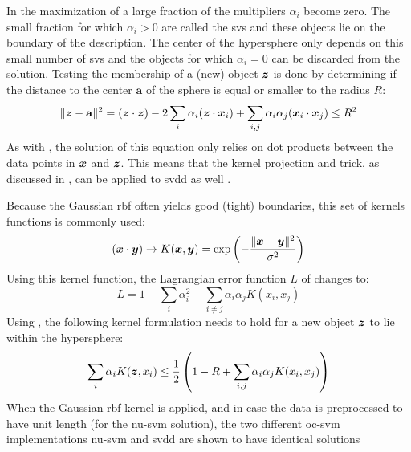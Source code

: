In the maximization of  a large fraction of the multipliers $\alpha_i$ become zero.
The small fraction for which $\alpha_i > 0$ are called the \glspl{sv} and these objects lie on the boundary of the description.
The center of the hypersphere only depends on this small number of \glspl{sv} and the objects for which $\alpha_i = 0$ can be discarded from the solution.
Testing the membership of a (new) object $\vectorsym{z}$ is done by determining if the distance to the center $\mathbf{a}$ of the sphere is equal or smaller to the radius $R$:
\begin{equation}\label{eq:svdd_test_object}
  \lVert \vectorsym{z} - \mathbf{a} \rVert ^2 = (\vectorsym{z} \cdot \vectorsym{z}) - 2 \sum_{i} \alpha_i(\vectorsym{z} \cdot \vectorsym{x}_i) + \sum_{i,j} \alpha_i \alpha_j (\vectorsym{x}_i \cdot \vectorsym{x}_j) \le R^2
\end{equation}
As with , the solution of this equation only relies on dot products between the data points in $\vectorsym{x}$ and $\vectorsym{z}$.
This means that the kernel projection and trick, as discussed in , can be applied to \gls{svdd} as well \cite{tax1999support,tax2002uniform}.

Because the Gaussian \gls{rbf} often yields good (\ie tight) boundaries, this set of kernels functions is commonly used:
\begin{equation}
  (\vectorsym{x} \cdot \vectorsym{y}) \rightarrow K(\vectorsym{x},\vectorsym{y}) = \operatorname{exp}\left(- \frac{\lVert \vectorsym{x} - \vectorsym{y} \rVert ^2}{\sigma^2}\right)
\end{equation}
Using this kernel function, the Lagrangian error function $L$ of  changes to:
\begin{equation}\label{eq:svdd_lagrange_kernel}
  L = 1 - \sum_{i} \alpha_i^2 - \sum_{i \ne j} \alpha_i \alpha_j K(x_i, x_j)
\end{equation}
Using , the following kernel formulation needs to hold for a new object $\vectorsym{z}$ to lie within the hypersphere:
\begin{equation}\label{eq:svdd_inequality}
  \sum_{i} \alpha_i K(\vectorsym{z}, x_i) \le \frac{1}{2} \left( 1 - R + \sum_{i,j} \alpha_i \alpha_j K(x_i, x_j) \right)
\end{equation}
When the Gaussian \gls{rbf} kernel is applied, and in case the data is preprocessed to have unit length (for the \gls{nu-svm} solution), the two different \gls{oc-svm} implementations \gls{nu-svm} and \gls{svdd} are shown to have identical solutions \cite{tax2002uniform,scholkopf2002learning}

